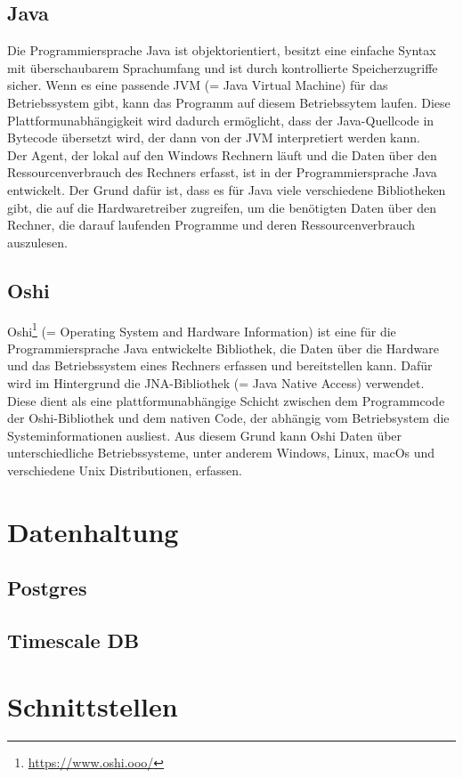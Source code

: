\documentclass{report}
\begin{document}
\subsection{Java}
Die Programmiersprache Java ist objektorientiert, besitzt eine einfache Syntax mit überschaubarem Sprachumfang und ist durch kontrollierte Speicherzugriffe sicher. Wenn es eine passende JVM (= Java Virtual Machine) für das Betriebssystem gibt, kann das Programm auf diesem Betriebssytem laufen. Diese Plattformunabhängigkeit wird dadurch ermöglicht, dass der Java-Quellcode in Bytecode übersetzt wird, der dann von der JVM interpretiert werden kann.\\
Der Agent, der lokal auf den Windows Rechnern läuft und die Daten über den Ressourcenverbrauch des Rechners erfasst, ist in der Programmiersprache Java entwickelt. Der Grund dafür ist, dass es für Java viele verschiedene Bibliotheken gibt, die auf die Hardwaretreiber zugreifen, um die benötigten Daten über den Rechner, die darauf laufenden Programme und deren Ressourcenverbrauch auszulesen.

\subsection{Oshi}
Oshi\footnote{\url{https://www.oshi.ooo/}} (= Operating System and Hardware Information) ist eine für die Programmiersprache Java entwickelte Bibliothek, die Daten über die Hardware und das Betriebssystem eines Rechners erfassen und bereitstellen kann. Dafür wird im Hintergrund die JNA-Bibliothek (= Java Native Access) verwendet. Diese dient als eine plattformunabhängige Schicht zwischen dem Programmcode der Oshi-Bibliothek und dem nativen Code, der abhängig vom Betriebsystem die Systeminformationen ausliest. Aus diesem Grund kann Oshi Daten über unterschiedliche Betriebssysteme, unter anderem Windows, Linux, macOs und verschiedene Unix Distributionen, erfassen.

\section{Datenhaltung}
\subsection{Postgres}
\subsection{Timescale DB}

\section{Schnittstellen}
\end{document}
